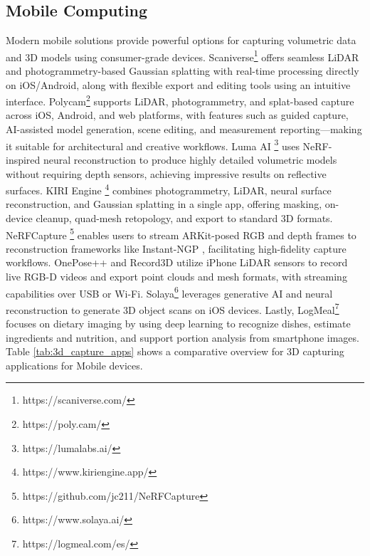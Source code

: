 \documentclass[preprint,12pt]{elsarticle}
\begin{document}
\subsection{Mobile Computing}
\label{sec:mobile_computing}
Modern mobile solutions provide powerful options for capturing volumetric data and 3D models using consumer-grade devices. Scaniverse\footnote{https://scaniverse.com/} offers seamless LiDAR and photogrammetry-based Gaussian splatting with real-time processing directly on iOS/Android, along with flexible export and editing tools using an intuitive interface. Polycam\footnote{https://poly.cam/} supports LiDAR, photogrammetry, and splat-based capture across iOS, Android, and web platforms, with features such as guided capture, AI-assisted model generation, scene editing, and measurement reporting—making it suitable for architectural and creative workflows. Luma AI \footnote{https://lumalabs.ai/} uses NeRF-inspired neural reconstruction to produce highly detailed volumetric models without requiring depth sensors, achieving impressive results on reflective surfaces. KIRI Engine \footnote{https://www.kiriengine.app/} combines photogrammetry, LiDAR, neural surface reconstruction, and Gaussian splatting in a single app, offering masking, on-device cleanup, quad-mesh retopology, and export to standard 3D formats. NeRFCapture \footnote{https://github.com/jc211/NeRFCapture} enables users to stream ARKit-posed RGB and depth frames to reconstruction frameworks like Instant-NGP \cite{muller2022instant}, facilitating high-fidelity capture workflows. OnePose++\cite{he2022onepose++} and  Record3D utilize iPhone LiDAR sensors to record live RGB-D videos and export point clouds and mesh formats, with streaming capabilities over USB or Wi-Fi. Solaya\footnote{https://www.solaya.ai/} leverages generative AI and neural reconstruction to generate 3D object scans on iOS devices. Lastly, LogMeal\footnote{https://logmeal.com/es/} focuses on dietary imaging by using deep learning to recognize dishes, estimate ingredients and nutrition, and support portion analysis from smartphone images. Table \ref{tab:3d_capture_apps} shows a comparative overview for 3D capturing applications for Mobile devices.   
\end{document}
